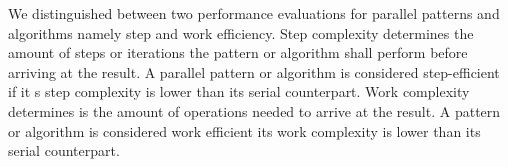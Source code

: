We distinguished between two performance evaluations for parallel patterns and algorithms namely step and work efficiency. Step complexity determines the amount of steps or iterations the pattern or algorithm shall perform before arriving at the result. A parallel pattern or algorithm is considered step-efficient if it s step complexity is lower than its serial counterpart. Work complexity determines is the amount of operations needed to arrive at the result. A pattern or algorithm is considered work efficient its work complexity is lower than its serial counterpart. 